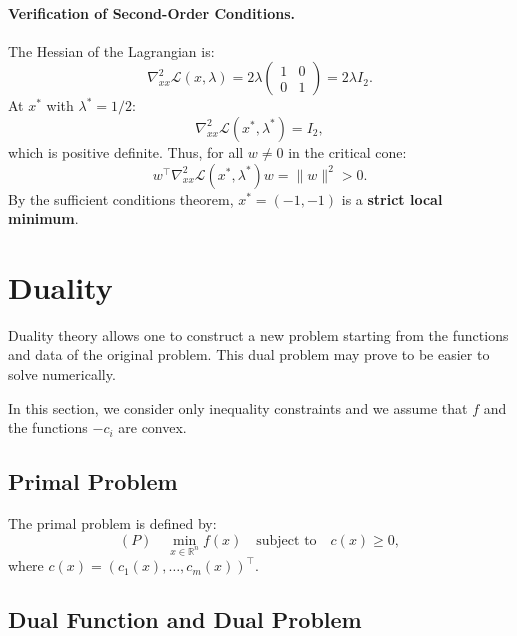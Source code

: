 \begin{exemple}
    \paragraph{Verification of Second-Order Conditions.}
    The Hessian of the Lagrangian is:
    \begin{equation}
        \nabla_{xx}^2 \mathcal{L}(x, \lambda) = 2\lambda \begin{pmatrix} 1 & 0 \\ 0 & 1 \end{pmatrix} = 2\lambda I_2.
    \end{equation}
    At $x^*$ with $\lambda^* = 1/2$:
    \begin{equation}
        \nabla_{xx}^2 \mathcal{L}(x^*, \lambda^*) = I_2,
    \end{equation}
    which is positive definite. Thus, for all $w \neq 0$ in the critical cone:
    \begin{equation}
        w^\top \nabla_{xx}^2 \mathcal{L}(x^*, \lambda^*) w = \|w\|^2 > 0.
    \end{equation}
    By the sufficient conditions theorem, $x^* = (-1, -1)$ is a \textbf{strict local minimum}.
\end{exemple}

\section{Duality}

Duality theory allows one to construct a new problem starting from the functions and data of the original problem. This dual problem may prove to be easier to solve numerically.

In this section, we consider only inequality constraints and we assume that $f$ and the functions $-c_i$ are convex.

\subsection{Primal Problem}

The primal problem is defined by:
\begin{equation}
    (P) \quad \min_{x \in \mathbb{R}^n} f(x) \quad \text{subject to} \quad c(x) \geq 0,
\end{equation}
where $c(x) = (c_1(x), \dots, c_m(x))^\top$.

\subsection{Dual Function and Dual Problem}

